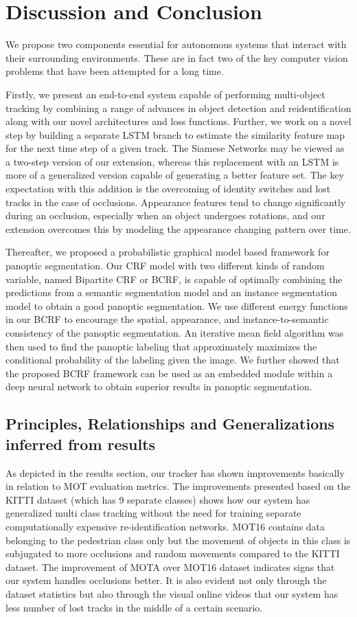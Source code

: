 \chapter{Discussion and Conclusion}

We propose two components essential for autonomous systems that interact with their surrounding environments. These are in fact two of the key computer vision problems that have been attempted for a long time. 

Firstly, we present an end-to-end system capable of performing multi-object tracking by combining a range of advances in object detection and reidentification along with our novel architectures and loss functions. Further, we work on a novel step by building a separate LSTM branch to estimate the similarity feature map for the next time step of a given track. The Siamese Networks may be viewed as a two-step version of our extension, whereas this replacement with an LSTM is more of a generalized version capable of generating a better feature set. The key expectation with this addition is the overcoming of identity switches and lost tracks in the case of occlusions. Appearance features tend to change significantly during an occlusion, especially when an object undergoes rotations, and our extension overcomes this by modeling the appearance changing pattern over time. 

Thereafter, we proposed a probabilistic graphical model based framework for panoptic segmentation. Our CRF model with two different kinds of random variable, named Bipartite CRF or BCRF, is capable of optimally combining the predictions from a semantic segmentation model and an instance segmentation model to obtain a good panoptic segmentation. We use different energy functions in our BCRF to encourage the spatial, appearance, and instance-to-semantic consistency of the panoptic segmentation. An iterative mean field algorithm was then used to find the panoptic labeling that approximately maximizes the conditional probability of the labeling given the image. We further showed that the proposed BCRF framework can be used as an embedded module within a deep neural network to obtain superior results in panoptic segmentation.

\section{Principles, Relationships and Generalizations inferred from results}
As depicted in the results section, our tracker has shown improvements basically in relation to MOT evaluation metrics. The improvements presented based on the KITTI dataset (which has 9 separate classes) shows how our system has generalized multi class tracking without the need for training separate computationally expensive re-identification networks. MOT16 contains data belonging to the pedestrian class only but the movement of objects in this class is subjugated to more occlusions and random movements compared to the KITTI dataset. The improvement of MOTA over MOT16 dataset indicates signs that our system handles occlusions better. It is also evident not only through the dataset statistics but also through the visual online videos that our system has less number of lost tracks in the middle of a certain scenario.

